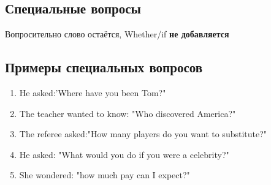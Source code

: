 \subsection{Специальные вопросы}
\p
Вопросительно слово остаётся, Whether/if \textbf{не добавляется}

\subsection{Примеры специальных вопросов}
\p
\begin{enumerate}
    \item He asked:'Where have you been Tom?"\\
    \item The teacher wanted to know: "Who discovered America?"\\
    \item The referee asked:"How many players do you want to substitute?"\\
    \item He asked: "What would you do if you were a celebrity?"\\
    \item She wondered: "how much pay can I expect?"\\
\end{enumerate}
